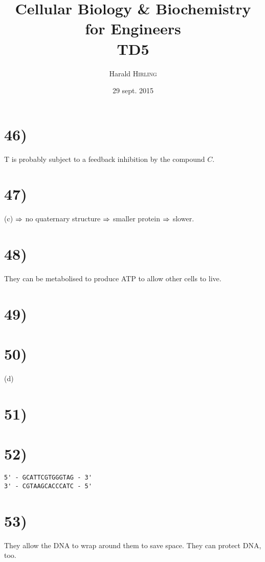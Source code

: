 

\title{Cellular Biology \& Biochemistry for Engineers\\TD5}
\author{Harald \textsc{Hirling}}
\date{29 sept. 2015}


\maketitle

\section*{46)}

T is probably subject to a feedback inhibition by the compound $C$.

\section*{47)}
(c) $\Rightarrow$ no quaternary structure $\Rightarrow$ smaller protein $\Rightarrow$ slower.

\section*{48)}
They can be metabolised to produce ATP to allow other cells to live.

\section*{49)}


\section*{50)}
(d)

\section*{51)}


\section*{52)}
\begin{verbatim}
5' - GCATTCGTGGGTAG - 3'
3' - CGTAAGCACCCATC - 5'
\end{verbatim}

\section*{53)}
They allow the DNA to wrap around them to save space. They can protect DNA, too.


